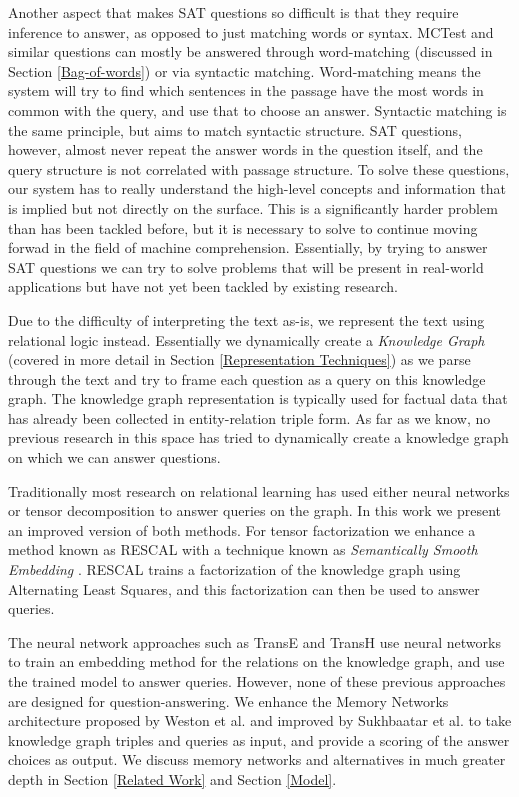 \documentclass[pageno]{final_paper}
\begin{document}
Another aspect that makes SAT questions so difficult is that they require
inference to answer, as opposed to just matching words or syntax. MCTest and
similar questions can mostly be answered through word-matching (discussed in
Section \ref{Bag-of-words}) or via syntactic matching. Word-matching means the
system will try to find which sentences in the passage have the most words in
common with the query, and use that to choose an answer. Syntactic matching is
the same principle, but aims to match syntactic structure. SAT questions,
however, almost never repeat the answer words in the question itself, and the
query structure is not correlated with passage structure. To solve these
questions, our system has to really understand the high-level concepts and
information that is implied but not directly on the surface. This is a
significantly harder problem than has been tackled before, but it is necessary
to solve to continue moving forwad in the field of machine comprehension.
Essentially, by trying to answer SAT questions we can try to solve problems that
will be present in real-world applications but have not yet been tackled by
existing research.

Due to the difficulty of interpreting the text as-is, we represent the text
using relational logic instead. Essentially we dynamically create a
\textit{Knowledge Graph} (covered in more detail in Section \ref{Representation
Techniques}) as we parse through the text and try to frame each question as a
query on this knowledge graph. The knowledge graph representation is typically
used for factual data that has already been collected in entity-relation triple
form. As far as we know, no previous research in this space has tried to
dynamically create a knowledge graph on which we can answer questions.

Traditionally most research on relational learning has used either neural
networks or tensor decomposition to answer queries on the graph. In this work we
present an improved version of both methods. For tensor factorization we enhance
a method known as RESCAL \cite{Bader2007, Nickel2011} with a technique known as
\textit{Semantically Smooth Embedding} \cite{Guo2015}. RESCAL trains a
factorization of the knowledge graph using Alternating Least Squares, and this
factorization can then be used to answer queries.

The neural network approaches such as TransE \cite{Bordes2013} and TransH
\cite{Wang2014} use neural networks to train an embedding method for the
relations on the knowledge graph, and use the trained model to answer queries.
However, none of these previous approaches are designed for question-answering.
We enhance the Memory Networks architecture proposed by Weston et al.
\cite{Weston2015a} and improved by Sukhbaatar et al. \cite{Sukhbaatar2015} to
take knowledge graph triples and queries as input, and provide a scoring of the
answer choices as output. We discuss memory networks and alternatives in much
greater depth in Section \ref{Related Work} and Section \ref{Model}.
\end{document}
